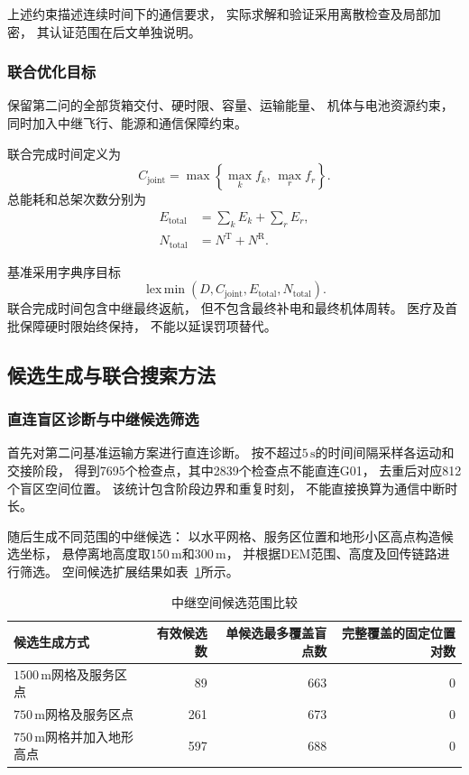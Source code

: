 \documentclass[bwprint]{gmcmthesis}
\begin{document}
上述约束描述连续时间下的通信要求，
实际求解和验证采用离散检查及局部加密，
其认证范围在后文单独说明。

\subsubsection{联合优化目标}

保留第二问的全部货箱交付、硬时限、容量、运输能量、
机体与电池资源约束，
同时加入中继飞行、能源和通信保障约束。

联合完成时间定义为
\begin{equation}
    C_{\mathrm{joint}}
    =
    \max\left\{
    \max_k f_k,\,
    \max_r f_r
    \right\}.
\end{equation}
总能耗和总架次数分别为
\begin{align}
    E_{\mathrm{total}}
    &=
    \sum_k E_k+\sum_r E_r,\\
    N_{\mathrm{total}}
    &=
    N^{\mathrm{T}}+N^{\mathrm{R}}.
\end{align}

基准采用字典序目标
\begin{equation}
    \operatorname{lex\,min}
    \left(
    D,C_{\mathrm{joint}},
    E_{\mathrm{total}},N_{\mathrm{total}}
    \right).
\end{equation}
联合完成时间包含中继最终返航，
但不包含最终补电和最终机体周转。
医疗及首批保障硬时限始终保持，
不能以延误罚项替代。

\subsection{候选生成与联合搜索方法}

\subsubsection{直连盲区诊断与中继候选筛选}

首先对第二问基准运输方案进行直连诊断。
按不超过$5\,\mathrm{s}$的时间间隔采样各运动和交接阶段，
得到7695个检查点，其中2839个检查点不能直连G01，
去重后对应812个盲区空间位置。
该统计包含阶段边界和重复时刻，
不能直接换算为通信中断时长。

随后生成不同范围的中继候选：
以水平网格、服务区位置和地形小区高点构造候选坐标，
悬停离地高度取$150\,\mathrm{m}$和$300\,\mathrm{m}$，
并根据DEM范围、高度及回传链路进行筛选。
空间候选扩展结果如表~\ref{tab:q3_candidates}所示。

\begin{table}[htbp]
    \centering
    \caption{中继空间候选范围比较}
    \label{tab:q3_candidates}
    \begin{tabular}{lrrr}
        \toprule
        候选生成方式 & 有效候选数 &
        单候选最多覆盖盲点数 & 完整覆盖的固定位置对数 \\
        \midrule
        $1500\,\mathrm{m}$网格及服务区点
        &89&663&0\\
        $750\,\mathrm{m}$网格及服务区点
        &261&673&0\\
        $750\,\mathrm{m}$网格并加入地形高点
        &597&688&0\\
        \bottomrule
    \end{tabular}
\end{table}
\end{document}
